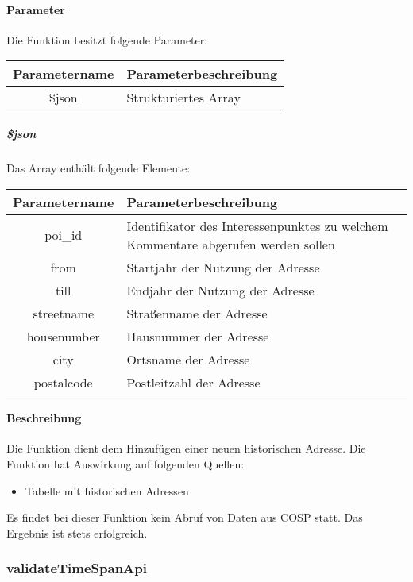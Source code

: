 \paragraph{Parameter} Die Funktion besitzt folgende Parameter:
\begin{table}[H]
	\begin{tabular}{|c|p{11cm}|}
		\hline
		\textbf{Parametername} & \textbf{Parameterbeschreibung} \\ \hline
		\$json & Strukturiertes Array \\ \hline
	\end{tabular}
\end{table}
\subparagraph{\$json}Das Array enthält folgende Elemente:
\begin{table}[H]
	\begin{tabular}{|c|p{11cm}|}
		\hline
		\textbf{Parametername} & \textbf{Parameterbeschreibung} \\ \hline
		poi\_id & Identifikator des Interessenpunktes zu welchem Kommentare abgerufen werden sollen \\ \hline
		from & Startjahr der Nutzung der Adresse \\ \hline
		till & Endjahr der Nutzung der Adresse \\ \hline
		streetname & Straßenname der Adresse \\ \hline
		housenumber & Hausnummer der Adresse \\ \hline
		city & Ortsname der Adresse \\ \hline
		postalcode & Postleitzahl der Adresse \\ \hline
	\end{tabular}
\end{table}
\paragraph{Beschreibung} Die Funktion dient dem Hinzufügen einer neuen historischen Adresse. Die Funktion hat Auswirkung auf folgenden Quellen:
\begin{itemize}
	\item Tabelle mit historischen Adressen
\end{itemize}
Es findet bei dieser Funktion kein Abruf von Daten aus {\glqq COSP\grqq} statt. Das Ergebnis ist stets erfolgreich.
\subsubsection{validateTimeSpanApi}
